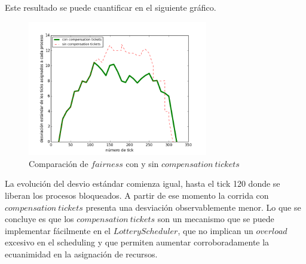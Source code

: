 \documentclass[11pt, a4paper, twoside]{article}
\begin{document}
Este resultado se puede cuantificar en el siguiente gráfico.

\begin{figure}[H]
\centering
\includegraphics[width=0.7\textwidth]{../experimentacion/ej10-compensation/plot-comparativa.png}
\caption{Comparación de $fairness$ con y sin $compensation\ tickets$}
\end{figure}

La evolución del desvio estándar comienza igual, hasta el tick 120 donde se liberan los procesos bloqueados. A partir de ese momento la corrida con $compensation\ tickets$ presenta una desviación observablemente menor. Lo que se concluye es que los $compensation\ tickets$ son un mecanismo que se puede implementar fácilmente en el $Lottery Scheduler$, que no implican un $overload$ excesivo en el scheduling y que permiten aumentar corroboradamente la ecuanimidad en la asignación de recursos.
\end{document}
